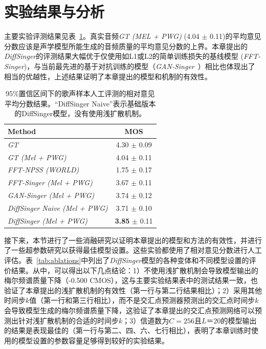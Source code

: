 \section{实验结果与分析}
主要实验评测结果见表~\ref{tab:main_exp}。真实音频\textit{GT (MEL + PWG)} (4.04 $\pm$ 0.11)的平均意见分数应该是声学模型所能生成的音频质量的平均意见分数的上界。本章提出的\textit{DiffSinger}的评测结果大幅优于仅使用如L1或L2的简单训练损失的基线模型 (\textit{FFT-Singer})，与当前最先进的基于对抗训练的模型（\textit{GAN-Singer}~\cite{wu2020adversarially}）相比也体现出了相当的优越性，上述结果证明了本章提出的模型和机制的有效性。
\begin{table}[h]
	\centering
	\begin{tabular}{l|c}
		\toprule
		Method &  MOS  \\
		\midrule
		\textit{GT} & 4.30 $\pm$ 0.09  \\
	    \textit{GT (Mel + PWG)} & 4.04 $\pm$ 0.11  \\
		\midrule
		\textit{FFT-NPSS (WORLD)} & 1.75  $\pm$ 0.17  \\
		\textit{FFT-Singer (Mel + PWG)} & 3.67 $\pm$ 0.11 \\
		\textit{GAN-Singer (Mel + PWG)} & 3.74 $\pm$ 0.12  \\
		\midrule
		\textit{DiffSinger Naive (Mel + PWG)} & 3.71 $\pm$ 0.10 \\
		\textit{DiffSinger (Mel + PWG)} & \textbf{3.85} $\pm$ 0.11 \\
		\bottomrule
	\end{tabular}
	\caption{95\%置信区间下的歌声样本人工评测的相对意见平均分数结果。``DiffSinger Naive''表示基础版本的DiffSinger模型，没有使用浅扩散机制。}
	\label{tab:main_exp}
\end{table}
接下来，本节进行了一些消融研究以证明本章提出的模型和方法的有效性，并进行了一些超参数研究以获得最佳模型设置。这些实验都使用了相对意见分数进行人工评估。表~\ref{tab:ablations}中列出了\textit{DiffSinger}模型的各种变体和不同模型设置的评价结果。从中，可以得出以下几点结论：1）不使用浅扩散机制会导致模型输出的梅尔频谱质量下降（-0.500 CMOS），这与主要实验结果表中的测试结果一致，也验证了本章提出的浅扩散机制的有效性（第一行与第二行结果相比）；2）采用其他时间步$k$值（第一行和第三行相比），而不是交汇点预测器预测出的交汇点时间步$k$会导致模型生成的梅尔频谱质量下降，这验证了本章提出的交汇点预测网络可以预测出针对浅扩散机制的合适的时间步$k$；3）信道数为$C=256$且$L＝20$的模型输出的结果是表现最佳的（第一行与第二、四、六、七行相比），表明了本章训练时使用的模型设置的参数容量足够得到较好的实验结果。
